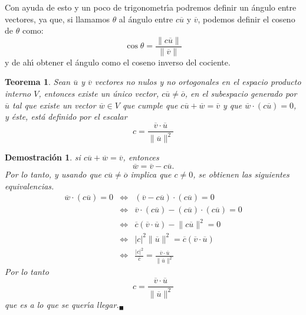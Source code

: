 \documentclass[a4paper,11pt]{article}
\theoremstyle{teoremas}
\newtheorem{teorema}{Teorema}[section]
\theoremstyle{ejemplos}
\theoremstyle{definiciones}
\theoremstyle{lemas}
\newtheorem*{demostracion}{Demostraci\'on}
\begin{document}
Con ayuda de esto y un poco de trigonometr\'{\i}a podremos definir un \'angulo entre vectores, ya que, si llamamos $\theta$ al \'angulo entre $c\overline{u}$ y $\overline{v}$, podemos definir el coseno de $\theta$ como:
\begin{equation}
 \cos \theta = \frac{\lVert c\overline{u} \rVert}{\lVert \overline{v} \rVert}
\end{equation}
y de ah\'{\i} obtener el \'angulo como el coseno inverso del cociente.
\begin{teorema}
 Sean $\overline{u}$ y $\overline{v}$ vectores no nulos y no ortogonales en el espacio producto interno $V$, entonces existe un \'unico vector, $c\overline{u} \neq \overline{o}$, en el subespacio generado por $\overline{u}$ tal que existe un vector $\overline{w} \in V$ que cumple que $c\overline{u} + \overline{w} = \overline{v}$ y que $\overline{w}\cdot \left( c\overline{u} \right)=0$, y \'este, est\'a definido por el escalar
 \begin{equation}
  c = \frac{\overline{v}\cdot \overline{u}}{\lVert \overline{u} \rVert^2}
 \end{equation}
\end{teorema}
\begin{demostracion}
 si $c\overline{u} + \overline{w} = \overline{v}$, entonces
 \begin{equation}
  \overline{w} = \overline{v} - c\overline{u}.
 \end{equation}
 Por lo tanto, y usando que $c\overline{u} \neq \overline{o}$ implica que $c \neq 0$, se obtienen las siguientes equivalencias.
 \begin{eqnarray*}
  \overline{w}\cdot \left( c\overline{u} \right) = 0
   & \Leftrightarrow & \left( \overline{v} - c\overline{u} \right)\cdot \left( c\overline{u} \right) = 0 \\ 
   & \Leftrightarrow & \overline{v}\cdot \left( c\overline{u} \right) - \left( c\overline{u} \right) \cdot \left( c\overline{u} \right) = 0 \\
   & \Leftrightarrow & \overline{c} \left( \overline{v} \cdot \overline{u} \right) - \lVert c\overline{u} \rVert^2 = 0 \\
   & \Leftrightarrow & \lvert c \rvert^2 \lVert \overline{u} \rVert^2 = \overline{c} \left( \overline{v} \cdot \overline{u} \right) \\
   & \Leftrightarrow & \frac{\lvert c \rvert^2}{\overline{c}} = \frac{\overline{v} \cdot \overline{u} }{\lVert \overline{u} \rVert^2} 
 \end{eqnarray*}
 Por lo tanto
 \begin{equation}
  c = \frac{\overline{v}\cdot \overline{u}}{\lVert \overline{u} \rVert^2}
 \end{equation}
 que es a lo que se quer\'{\i}a llegar.${}_{\blacksquare}$
\end{demostracion}
\end{document}
